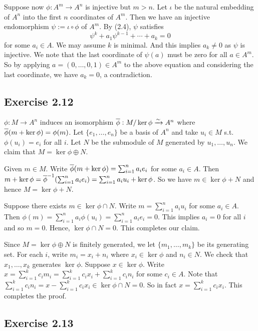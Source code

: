 \documentclass[../A&M.tex]{subfiles}
\begin{document}
Suppose now $\phi : A^m \to A^n$ is injective but $m>n$. Let $\iota$ be the natural embedding of $A^n$ into the first $n$ coordinates of $A^m$. Then we have an injective endomorphism $\psi := \iota \circ \phi$ of $A^m$. By (2.4), $\psi$ satisfies
$$
\psi^k + a_1\psi^{k-1} + \cdots + a_k = 0
$$
for some $a_i\in A$. We may assume $k$ is minimal. And this implies $a_k \neq 0$ as $\psi$ is injective. We note that the last coordinate of $\psi(a)$ must be zero for all $a\in A^m$. So by applying $a=(0,\ldots,0,1) \in A^m$ to the above equation and considering the last coordinate, we have $a_k = 0$, a contradiction.

\subsection*{Exercise 2.12}

$\phi: M\to A^n$ induces an isomorphism $\overline{\phi}: M/\ker \phi \xrightarrow{\sim} A^n$ where $\overline{\phi}(m+\ker\phi) = \phi(m)$. Let $\{e_1,\ldots,e_n\}$ be a basis of $A^n$ and take $u_i\in M$ s.t. $\phi(u_i)=e_i$ for all $i$. Let $N$ be the submodule of $M$ generated by $u_1,\ldots,u_n$. We claim that $M = \ker\phi \oplus N$.

Given $m\in M$. Write $\overline{\phi}(m+\ker\phi) = \sum_{i=1}^n a_ie_i$ for some $a_i\in A$. Then $m+\ker\phi = \overline{\phi}^{-1}(\sum_{i=1}^n a_ie_i) = \sum_{i=1}^n a_iu_i + \ker\phi$. So we have $m \in \ker\phi + N$ and hence $M = \ker\phi + N$.

Suppose there exists $m \in \ker\phi \cap N$. Write $m = \sum_{i=1}^n a_iu_i$ for some $a_i\in A$. Then $\phi(m) = \sum_{i=1}^n a_i \phi(u_i) =  \sum_{i=1}^n a_i e_i = 0$. This implies $a_i=0$ for all $i$ and so $m=0$. Hence, $\ker\phi \cap N=0$. This completes our claim.

Since $M = \ker\phi \oplus N$ is finitely generated, we let $\{m_1,\ldots,m_k\}$ be its generating set. For each $i$, write $m_i = x_i + n_i$ where $x_i\in\ker\phi$ and $n_i \in N$. We check that $x_1,\ldots,x_k$ generates $\ker\phi$. Suppose $x\in \ker\phi$. Write $x = \sum_{i=1}^k c_im_i = \sum_{i=1}^k c_ix_i + \sum_{i=1}^k c_in_i$ for some $c_i \in A$. Note that $\sum_{i=1}^k c_in_i = x - \sum_{i=1}^k c_ix_i \in \ker\phi \cap N = 0$. So in fact $x = \sum_{i=1}^k c_ix_i$. This completes the proof.

\subsection*{Exercise 2.13}
\end{document}
